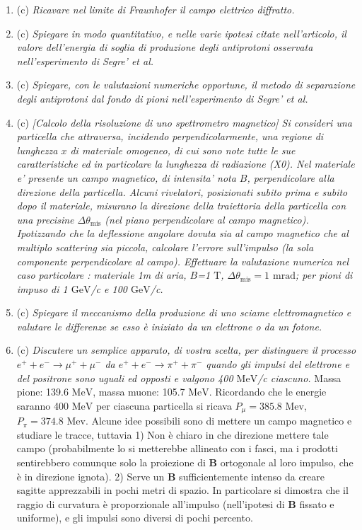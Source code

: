 \documentclass{article}
\renewcommand{\c}{(c)}
\renewcommand{\t}[1]{\textit{ #1}}
\renewcommand{\vec}[1]{\mathbf{#1}}
\begin{document}
\begin{enumerate}
{		e’ l’energia per unita’ di
		frequenza irraggiata da una carica accelerata in funzione dell’angolo di
		emissione.}
	\item\c\t{Ricavare nel limite di Fraunhofer il campo elettrico diffratto.}
	\item\c\t{Spiegare in modo quantitativo, e nelle varie ipotesi citate nell'articolo, il valore
		dell'energia di soglia di produzione degli antiprotoni osservata nell’esperimento di
		Segre’ et al.}
	\item\c\t{Spiegare, con le valutazioni numeriche opportune, il metodo di separazione degli
		antiprotoni dal fondo di pioni nell’esperimento di Segre’ et al.}
	\item\c\t{[Calcolo della risoluzione di uno spettrometro magnetico] Si consideri una
		particella che attraversa, incidendo perpendicolarmente, una regione di lunghezza
		$x$ di materiale omogeneo, di cui sono note tutte le sue caratteristiche ed in
		particolare la lunghezza di radiazione (X0). Nel materiale e' presente un campo
		magnetico, di intensita' nota $B$, perpendicolare alla direzione della particella.
		Alcuni rivelatori, posizionati subito prima e subito dopo il materiale, misurano la
		direzione della traiettoria della particella con una precisine $\Delta\theta_\mathrm{mis}$ (nel piano
		perpendicolare al campo magnetico). Ipotizzando che la deflessione angolare
		dovuta sia al campo magnetico che al multiplo scattering sia piccola, calcolare
		l'errore sull'impulso (la sola componente perpendicolare al campo). Effettuare la
		valutazione numerica nel caso particolare : materiale 1m di aria, $B$=1 $\mathrm{T}$, $\Delta\theta_\mathrm{mis}=1$ $\mathrm{mrad}$; per pioni di impuso di 1 $\mathrm{GeV}$/c e 100 $\mathrm{GeV}$/c.}
	\item\c\t{Spiegare il meccanismo della produzione di uno sciame elettromagnetico e
		valutare le differenze se esso è iniziato da un elettrone o da un fotone.}
	\item\c\t{Discutere un semplice apparato, di vostra scelta, per distinguere il processo
		$e^+ + e^- \to \mu^+ +\mu^-$
		da $e^+ + e^- \to \pi^+ + \pi^-$
		quando gli impulsi del elettrone e del
		positrone sono uguali ed opposti e valgono 400 $\mathrm{MeV}$/c ciascuno.}
		Massa pione: 139.6 $\mathrm{MeV}$, massa muone: 105.7 $\mathrm{MeV}$. Ricordando che le energie saranno 400 $\mathrm{MeV}$ per ciascuna particella si ricava $P_\mu = 385.8$ $\mathrm{Mev}$, $P_\pi = 374.8$ $\mathrm{Mev}$. Alcune idee possibili sono di mettere un campo magnetico e studiare le tracce, tuttavia 1) Non è chiaro in che direzione mettere tale campo (probabilmente lo si metterebbe allineato con i fasci, ma i prodotti sentirebbero comunque solo la proiezione di $\vec{B}$ ortogonale al loro impulso, che è in direzione ignota). 2) Serve un $\vec{B}$ sufficientemente intenso da creare sagitte apprezzabili in pochi metri di spazio. In particolare si dimostra che il raggio di curvatura è proporzionale all'impulso (nell'ipotesi di $\vec{B}$ fissato e uniforme), e gli impulsi sono diversi di pochi percento.\\

\end{enumerate}
\end{document}
